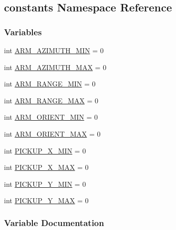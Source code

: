 \hypertarget{namespaceconstants}{}\subsection{constants Namespace Reference}
\label{namespaceconstants}
\subsubsection*{Variables}
\begin{DoxyCompactItemize}
\item 
int \mbox{\hyperlink{namespaceconstants_a8112376fe415e03687dcfcf32508ff5b}{A\+R\+M\+\_\+\+A\+Z\+I\+M\+U\+T\+H\+\_\+\+M\+IN}} = 0
\item 
int \mbox{\hyperlink{namespaceconstants_a32e0792803d2cda1bfc22b90f37f3e3d}{A\+R\+M\+\_\+\+A\+Z\+I\+M\+U\+T\+H\+\_\+\+M\+AX}} = 0
\item 
int \mbox{\hyperlink{namespaceconstants_a185349fe1a4462c42310332cc79acacb}{A\+R\+M\+\_\+\+R\+A\+N\+G\+E\+\_\+\+M\+IN}} = 0
\item 
int \mbox{\hyperlink{namespaceconstants_ac7dbe3d17e1603a0dec2f32acb4adb29}{A\+R\+M\+\_\+\+R\+A\+N\+G\+E\+\_\+\+M\+AX}} = 0
\item 
int \mbox{\hyperlink{namespaceconstants_a04a3b80c0f1a2b5dbb41e8e67d1388ff}{A\+R\+M\+\_\+\+O\+R\+I\+E\+N\+T\+\_\+\+M\+IN}} = 0
\item 
int \mbox{\hyperlink{namespaceconstants_a8d807b2016ecbfc6475116fd0a076e71}{A\+R\+M\+\_\+\+O\+R\+I\+E\+N\+T\+\_\+\+M\+AX}} = 0
\item 
int \mbox{\hyperlink{namespaceconstants_a3665696f70f5b437797e0d13d110420c}{P\+I\+C\+K\+U\+P\+\_\+\+X\+\_\+\+M\+IN}} = 0
\item 
int \mbox{\hyperlink{namespaceconstants_a9ee9486608b258c0590c50f4ede72be5}{P\+I\+C\+K\+U\+P\+\_\+\+X\+\_\+\+M\+AX}} = 0
\item 
int \mbox{\hyperlink{namespaceconstants_af4d50d2aff64fadb62d4a0320240ac84}{P\+I\+C\+K\+U\+P\+\_\+\+Y\+\_\+\+M\+IN}} = 0
\item 
int \mbox{\hyperlink{namespaceconstants_aff4644fbe2c3332f95ddce3081cc34ca}{P\+I\+C\+K\+U\+P\+\_\+\+Y\+\_\+\+M\+AX}} = 0
\end{DoxyCompactItemize}


\subsubsection{Variable Documentation}
\mbox{\label{namespaceconstants_a32e0792803d2cda1bfc22b90f37f3e3d}} 
